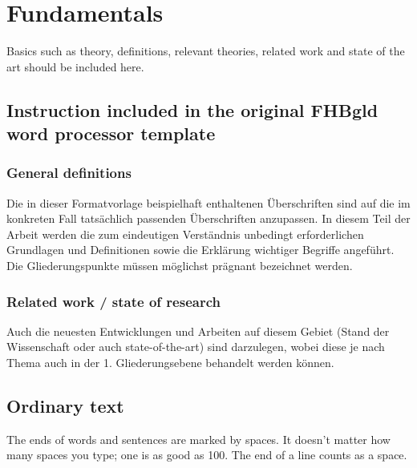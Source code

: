 \chapter{Fundamentals} 	%

Basics such as theory, definitions, relevant theories, related work and state of the art should be included here.

\section{Instruction included in the original FHBgld word processor template}
\subsection{General definitions}
Die in dieser Formatvorlage beispielhaft enthaltenen Überschriften sind auf die im
konkreten Fall tatsächlich passenden Überschriften anzupassen.
In diesem Teil der Arbeit werden die zum eindeutigen Verständnis unbedingt
erforderlichen Grundlagen und Definitionen sowie die Erklärung wichtiger Begriffe
angeführt.
Die Gliederungspunkte müssen möglichst prägnant bezeichnet werden.
\subsection{Related work / state of research}
Auch die neuesten Entwicklungen und Arbeiten auf diesem Gebiet (Stand der
Wissenschaft oder auch state-of-the-art) sind darzulegen, wobei diese je nach Thema
auch in der 1. Gliederungsebene behandelt werden können.

\section{Ordinary text}


The ends  of words and sentences are marked by spaces. It doesn't matter how many 
spaces    you type; one is as good as 100.  The
end of   a line counts as a space.

